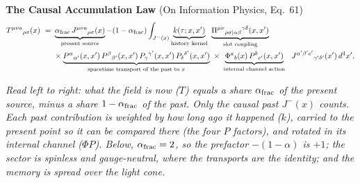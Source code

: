 \documentclass[9pt]{extarticle}
\newcommand{\say}[1]{{\color{note}\footnotesize\textit{#1}\par}}
\begin{document}
\vspace{-2pt}
{\color{ink}\textbf{The Causal Accumulation Law}} {\color{note}\small(On Information Physics, Eq.~61)}
{\small
\[
\begin{aligned}
T^{\mu\nu a}{}_{\rho\sigma}(x)\ =\ &\underbrace{\alpha_{\rm frac}\,J^{\mu\nu a}{}_{\rho\sigma}(x)}_{\text{present source}}-(1-\alpha_{\rm frac})\int_{J^-(x)}\underbrace{k(\tau;x,x')}_{\text{history kernel}}\ \underbrace{\Pi^{\mu\nu}{}_{\rho\sigma|\alpha\beta}{}^{\gamma\delta}(x,x')}_{\text{slot coupling}}\\
&\times\underbrace{P^{\alpha}{}_{\alpha'}(x,x')\,P^{\beta}{}_{\beta'}(x,x')\,P_{\gamma}{}^{\gamma'}(x,x')\,P_{\delta}{}^{\delta'}(x,x')}_{\text{spacetime transport of the past to }x}\ \times\ \underbrace{\Phi^a{}_b(x)\,P^b{}_{c'}(x,x')}_{\text{internal channel action}}\ \ J^{\alpha'\beta'c'}{}_{\gamma'\delta'}(x')\,d^4x'.
\end{aligned}
\]}
\say{Read left to right: what the field is now ($T$) equals a share $\alpha_{\rm frac}$ of the present source, minus a share $1-\alpha_{\rm frac}$ of the past. Only the causal past $J^-(x)$ counts. Each past contribution is weighted by how long ago it happened ($k$), carried to the present point so it can be compared there (the four $P$ factors), and rotated in its internal channel ($\Phi P$). Below, $\alpha_{\rm frac}=2$, so the prefactor $-(1-\alpha)$ is $+1$; the sector is spinless and gauge-neutral, where the transports are the identity; and the memory is spread over the light cone.}
\end{document}
